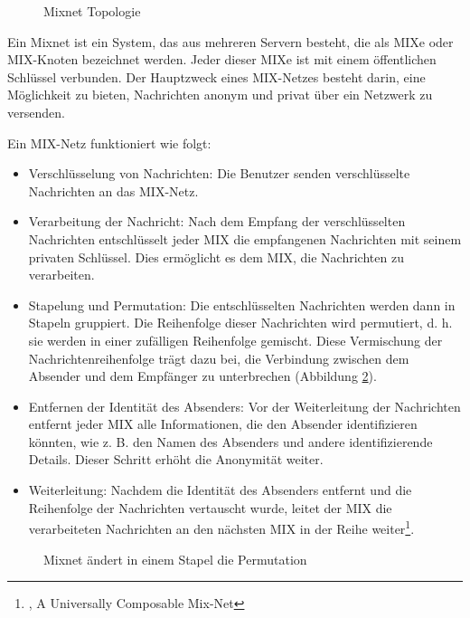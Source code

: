 \begin{figure}[h!]
    \centering
    
    \caption{Mixnet Topologie}
    \label{imgs:mixnet}
\end{figure}

Ein Mixnet ist ein System, das aus mehreren Servern besteht, die als MIXe oder MIX-Knoten bezeichnet werden. Jeder dieser MIXe ist mit einem öffentlichen Schlüssel verbunden. Der Hauptzweck eines MIX-Netzes besteht darin, eine Möglichkeit zu bieten, Nachrichten anonym und privat über ein Netzwerk zu versenden.

Ein MIX-Netz funktioniert wie folgt:

\begin{itemize}
    \item Verschlüsselung von Nachrichten: Die Benutzer senden verschlüsselte Nachrichten an das MIX-Netz.
    \item Verarbeitung der Nachricht: Nach dem Empfang der verschlüsselten Nachrichten entschlüsselt jeder MIX die empfangenen Nachrichten mit seinem privaten Schlüssel. Dies ermöglicht es dem MIX, die Nachrichten zu verarbeiten.
    \item Stapelung und Permutation: Die entschlüsselten Nachrichten werden dann in Stapeln gruppiert. Die Reihenfolge dieser Nachrichten wird permutiert, d. h. sie werden in einer zufälligen Reihenfolge gemischt. Diese Vermischung der Nachrichtenreihenfolge trägt dazu bei, die Verbindung zwischen dem Absender und dem Empfänger zu unterbrechen (Abbildung \ref{imgs:mixnet_stack}).
    \item Entfernen der Identität des Absenders: Vor der Weiterleitung der Nachrichten entfernt jeder MIX alle Informationen, die den Absender identifizieren könnten, wie z. B. den Namen des Absenders und andere identifizierende Details. Dieser Schritt erhöht die Anonymität weiter.
    \item Weiterleitung: Nachdem die Identität des Absenders entfernt und die Reihenfolge der Nachrichten vertauscht wurde, leitet der MIX die verarbeiteten Nachrichten an den nächsten MIX in der Reihe weiter\footnote{\cite{ComposableMixNet}, A Universally Composable Mix-Net}.
\end{itemize}

\begin{figure}[h!]
    \centering
    
    \caption{Mixnet ändert in einem Stapel die Permutation}
    \label{imgs:mixnet_stack}
\end{figure}

